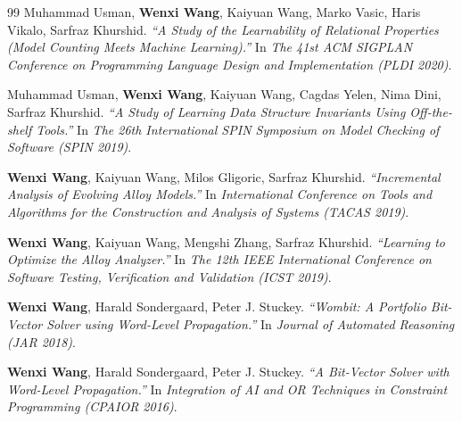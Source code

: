 \begin{thebibliography}{99}
	Muhammad Usman, \textbf{Wenxi Wang}, Kaiyuan Wang, Marko Vasic, Haris Vikalo, Sarfraz Khurshid.
	\emph{``A Study of the Learnability of Relational Properties (Model Counting Meets Machine Learning).''}
	In \textit{The 41st ACM SIGPLAN Conference on Programming Language Design and Implementation (PLDI 2020)}. \href{https://wenxiwang.github.io/papers/PLDI2020.pdf}{\color{color1}{\textbf{[PDF]}}}
	
	Muhammad Usman, \textbf{Wenxi Wang}, Kaiyuan Wang, Cagdas Yelen, Nima Dini, Sarfraz Khurshid.
	\emph{``A Study of Learning Data Structure Invariants Using Off-the-shelf Tools.''}
	In \textit{The 26th International SPIN Symposium on Model Checking of Software (SPIN 2019)}. \href{https://wenxiwang.github.io/papers/spin2019.pdf}{\color{color1}{\textbf{[PDF]}}}
	
	\textbf{Wenxi Wang}, Kaiyuan Wang, Milos Gligoric, Sarfraz Khurshid.
	\emph{``Incremental Analysis of Evolving Alloy Models.''}
	In \textit{International Conference on Tools and Algorithms for the Construction and Analysis of Systems (TACAS 2019)}. \href{https://wenxiwang.github.io/papers/incrementalAlloy.pdf}{\color{color1}{\textbf{[PDF]}}}
	
	\textbf{Wenxi Wang}, Kaiyuan Wang, Mengshi Zhang, Sarfraz Khurshid.
	\emph{``Learning to Optimize the Alloy Analyzer.''}
	In \textit{The 12th IEEE International Conference on Software Testing, Verification and Validation (ICST 2019)}. \href{https://wenxiwang.github.io/papers/Learning_to_Optimize_the_Alloy_Analyzer.pdf}{\color{color1}{\textbf{[PDF]}}}
	
	\textbf{Wenxi Wang}, Harald Sondergaard, Peter J. Stuckey.
	\emph{``Wombit: A Portfolio Bit-Vector Solver using Word-Level Propagation.''}
	In \textit{Journal of Automated Reasoning (JAR 2018)}. \href{https://wenxiwang.github.io/papers/Wombit.pdf}{\color{color1}{\textbf{[PDF]}}}
	
	\textbf{Wenxi Wang}, Harald Sondergaard, Peter J. Stuckey.
	\emph{``A Bit-Vector Solver with Word-Level Propagation.''}
	In \textit{Integration of AI and OR Techniques in Constraint Programming (CPAIOR 2016)}. \href{https://wenxiwang.github.io/papers/cpaior2016.pdf}{\color{color1}{\textbf{[PDF]}}}
	
	
\end{thebibliography}

